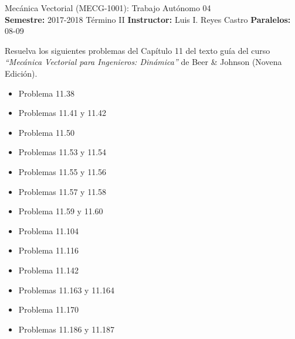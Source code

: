 \documentclass[ a4paper, twoside, 11pt]{article}
\newcommand{\numero}{04}
\begin{document}
\allowdisplaybreaks

\begin{center}
\Large Mec\'anica Vectorial (MECG-1001): Trabajo Aut\'onomo \numero \\[2ex]
\small \textbf{Semestre:} 2017-2018 T\'ermino II \qquad
\textbf{Instructor:} Luis I. Reyes Castro \qquad
\textbf{Paralelos:} 08-09
\end{center}
\fullskip

\begin{problem}
Resuelva los siguientes problemas del Cap\'itulo 11 del texto gu\'ia del curso \emph{``Mec\'anica Vectorial para Ingenieros: Din\'amica''} de Beer \& Johnson (Novena Edici\'on). 
\begin{itemize}
\item Problema 11.38
\item Problemas 11.41 y 11.42
\item Problema 11.50
\item Problemas 11.53 y 11.54
\item Problemas 11.55 y 11.56
\item Problemas 11.57 y 11.58
\item Problema 11.59 y 11.60
\item Problema 11.104
\item Problema 11.116
\item Problema 11.142
\item Problemas 11.163 y 11.164
\item Problema 11.170
\item Problemas 11.186 y 11.187
\end{itemize}

\end{problem}
\fullskip
\end{document}
